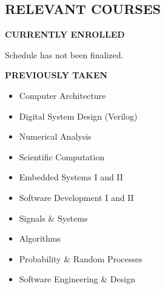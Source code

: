 \documentclass[margin]{res}
\begin{document}
\begin{resume}
  \section{RELEVANT COURSES}
  \vspace{-.125em}
  {\footnotesize\textbf{CURRENTLY ENROLLED}}
  \vspace{-.75em}
  \begin{multicols}{2}
    Schedule has not been finalized.
  \end{multicols}
  \vspace{-1.5em}
  {\footnotesize\textbf{PREVIOUSLY TAKEN}}
  \vspace{-.75em}
  \begin{multicols}{2}
    \begin{itemize}
    \item Computer Architecture
    \item Digital System Design (Verilog)
    \item Numerical Analysis
    \item Scientific Computation
    \item Embedded Systems I and II
    \item Software Development I and II
    \item Signals \& Systems
    \item Algorithms
    \item Probability \& Random Processes
    \item Software Engineering \& Design
    \end{itemize}
  \end{multicols}


\end{resume}
\end{document}
